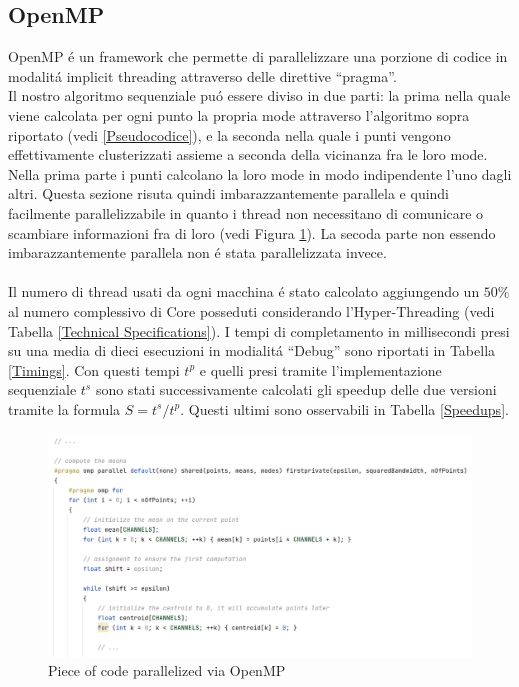 \documentclass{article}
\begin{document}
\newpage


\subsection{OpenMP}
OpenMP \'e un framework che permette di parallelizzare una porzione di codice in modalit\'a implicit threading attraverso delle direttive “pragma”.\\
Il nostro algoritmo sequenziale pu\'o essere diviso in due parti: la prima nella quale viene calcolata per ogni punto la propria mode attraverso l'algoritmo sopra riportato (vedi \ref{Pseudocodice}), e la seconda nella quale i punti vengono effettivamente clusterizzati assieme a seconda della vicinanza fra le loro mode. Nella prima parte i punti calcolano la loro mode in modo indipendente l'uno dagli altri. Questa sezione risuta quindi imbarazzantemente parallela e quindi facilmente parallelizzabile in quanto i thread non necessitano di comunicare o scambiare informazioni fra di loro (vedi Figura \ref{Code OpenMP}). La secoda parte non essendo imbarazzantemente parallela non \'e stata parallelizzata invece.\\
\\
Il numero di thread usati da ogni macchina \'e stato calcolato aggiungendo un $ 50\% $ al numero complessivo di Core posseduti considerando l'Hyper-Threading (vedi Tabella \ref{Technical Specifications}).
I tempi di completamento in millisecondi presi su una media di dieci esecuzioni in modialit\'a “Debug” sono riportati in Tabella \ref{Timings}. Con questi tempi $ t^{p} $ e quelli presi tramite l'implementazione sequenziale $ t^{s} $ sono stati successivamente calcolati gli speedup delle due versioni tramite la formula $ S=t^{s}/t^{p} $. Questi ultimi sono osservabili in Tabella \ref{Speedups}.

\vspace{10px}

\begin{figure}[!h]
\centering
\includegraphics[width= 15cm]{"Immagini/Code_OpenMP.PNG"}
\caption{Piece of code parallelized via OpenMP}
\label{Code OpenMP}
\end{figure}
\end{document}
